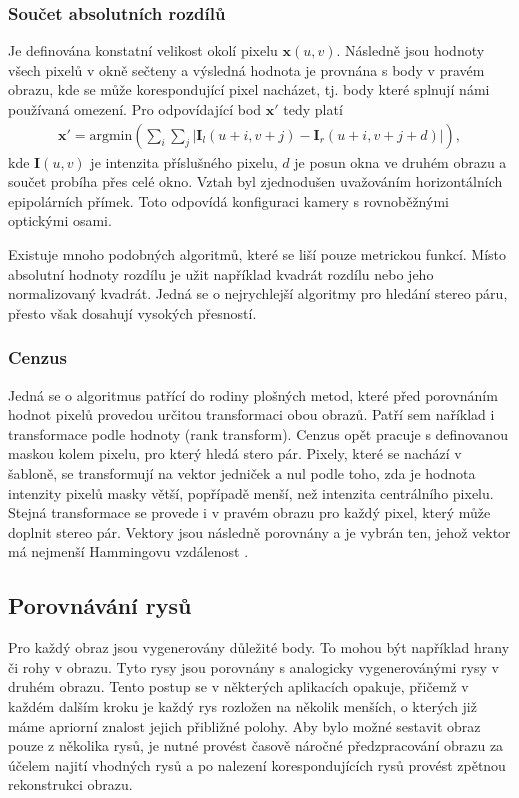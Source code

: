 \documentclass[twoside]{ctuthesis}
\newcommand{\tl}[1]{$\mathbf{#1}$}
\begin{document}
\subsubsection{Součet absolutních rozdílů}
Je definována konstatní velikost okolí pixelu $\mathbf{x}(u,v)$. Následně jsou hodnoty všech pixelů v okně sečteny a výsledná hodnota je provnána s body v pravém obrazu, kde se může korespondující pixel nacházet, tj. body které splnují námi používaná omezení. Pro odpovídající bod \tl{x'} tedy platí
\begin{align}
    \mathbf{x'} = \text{argmin}\left( \displaystyle\sum_i \displaystyle\sum_j |\mathbf{I}_l(u+i,v+j) - \mathbf{I}_r(u+i, v+j + d)| \right),
\end{align}
kde $\mathbf{I}(u,v)$ je intenzita příslušného pixelu, $d$ je posun okna ve druhém obrazu a součet probíha přes celé okno. Vztah byl zjednodušen uvažováním horizontálních epipolárních přímek. Toto odpovídá konfiguraci kamery s rovnoběžnými optickými osami.

    Existuje mnoho podobných algoritmů, které se liší pouze metrickou funkcí. Místo absolutní hodnoty rozdílu je užit například kvadrát rozdílu  nebo jeho normalizovaný kvadrát. Jedná se o nejrychlejší algoritmy pro hledání stereo páru, přesto však dosahují vysokých přesností. \cite{kuhl2005comparison, hartley2004multiple} 

\subsubsection{Cenzus}
\label{Sec:cenzus}
Jedná se o algoritmus patřící do rodiny plošných metod, které před porovnáním hodnot pixelů provedou určitou transformaci obou obrazů. Patří sem naříklad i transformace podle hodnoty (rank transform). Cenzus opět pracuje s definovanou maskou kolem pixelu, pro který hledá stero pár. Pixely, které se nachází v šabloně, se transformují na vektor jedniček a nul podle toho, zda je hodnota intenzity pixelů masky větší, popřípadě menší, než intenzita centrálního pixelu. Stejná transformace se provede i v pravém obrazu pro každý pixel, který může doplnit stereo pár. Vektory jsou následně porovnány a je vybrán ten, jehož vektor má nejmenší Hammingovu vzdálenost \cite{kuhl2005comparison, brown2003advances_in_stereo}.

\subsection{Porovnávání rysů}
Pro každý obraz jsou vygenerovány důležité body. To mohou být například hrany či rohy v obrazu. Tyto rysy jsou porovnány s analogicky vygenerovánými rysy v druhém obrazu. Tento postup se v některých aplikacích opakuje, přičemž v každém dalším kroku je každý rys rozložen na několik menších, o kterých již máme apriorní znalost jejich přibližné polohy. Aby bylo možné sestavit obraz pouze z několika rysů, je nutné provést časově náročné předzpracování obrazu za účelem najití vhodných rysů a po nalezení korespondujících rysů provést zpětnou rekonstrukci obrazu. \cite{brown2003advances_in_stereo}
\end{document}
